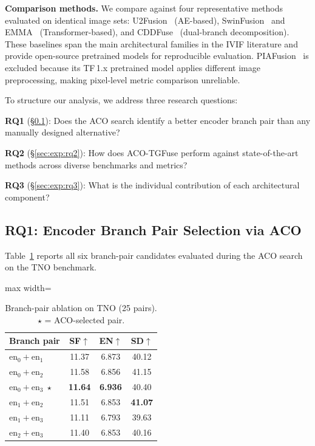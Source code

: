 \documentclass[a4paper,fleqn]{cas-dc}
\begin{document}
\textbf{Comparison methods.}
We compare against four representative methods evaluated on identical image
sets: U2Fusion~\cite{u2fusion2022} (AE-based), SwinFusion~\cite{swinfusion2022}
and EMMA~\cite{emma2024} (Transformer-based), and CDDFuse~\cite{cddfuse2023}
(dual-branch decomposition).  These baselines span the main architectural
families in the IVIF literature and provide open-source pretrained models
for reproducible evaluation.  PIAFusion~\cite{piafusion2022} is excluded
because its TF\,1.x pretrained model applies different image preprocessing,
making pixel-level metric comparison unreliable.

To structure our analysis, we address three research questions:

\textbf{RQ1} (\S\ref{sec:exp:rq1}): Does the ACO search identify a better
encoder branch pair than any manually designed alternative?

\textbf{RQ2} (\S\ref{sec:exp:rq2}): How does ACO-TGFuse perform against
state-of-the-art methods across diverse benchmarks and metrics?

\textbf{RQ3} (\S\ref{sec:exp:rq3}): What is the individual contribution of
each architectural component?

\subsection{RQ1: Encoder Branch Pair Selection via ACO}
\label{sec:exp:rq1}

Table~\ref{tab:branch} reports all six branch-pair candidates evaluated
during the ACO search on the TNO benchmark.

\begin{table}[htbp]
\centering
\caption{Branch-pair ablation on TNO (25 pairs).
         $\star$ = ACO-selected pair.}
\label{tab:branch}
\begin{adjustbox}{max width=\columnwidth}
\begin{tabular}{@{}lccc@{}}
\toprule
Branch pair & SF$\uparrow$ & EN$\uparrow$ & SD$\uparrow$ \\
\midrule
$\mathrm{en}_0+\mathrm{en}_1$ & 11.37 & 6.873 & 40.12 \\
$\mathrm{en}_0+\mathrm{en}_2$ & 11.58 & 6.856 & 41.15 \\
$\mathrm{en}_0+\mathrm{en}_3\;\star$ & \textbf{11.64} & \textbf{6.936} & 40.40 \\
$\mathrm{en}_1+\mathrm{en}_2$ & 11.51 & 6.853 & \textbf{41.07} \\
$\mathrm{en}_1+\mathrm{en}_3$ & 11.11 & 6.793 & 39.63 \\
$\mathrm{en}_2+\mathrm{en}_3$ & 11.40 & 6.853 & 40.16 \\
\bottomrule
\end{tabular}
\end{adjustbox}
\end{table}
\end{document}
